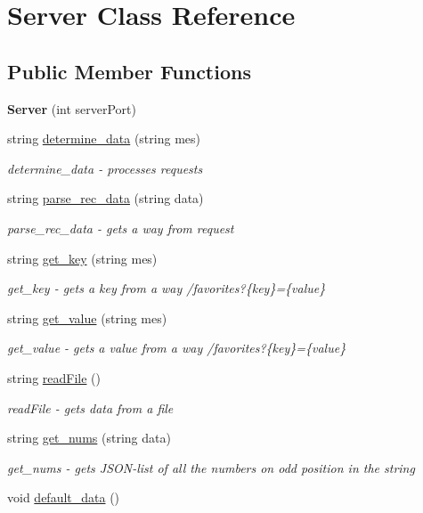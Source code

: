 \hypertarget{classServer}{}\section{Server Class Reference}
\label{classServer}
\subsection*{Public Member Functions}
\begin{DoxyCompactItemize}
\item 
{\bfseries Server} (int server\+Port)\hypertarget{classServer_aeae9f39088cd37184f26c07ba9948b96}{}\label{classServer_aeae9f39088cd37184f26c07ba9948b96}

\item 
string \hyperlink{classServer_ad77bc24f55d6ffb9628cc88d307fc8e2}{determine\+\_\+data} (string mes)
\begin{DoxyCompactList}\small\item\em determine\+\_\+data -\/ processes requests \end{DoxyCompactList}\item 
string \hyperlink{classServer_a6601c02b17df0bd6836290f036645b36}{parse\+\_\+rec\+\_\+data} (string data)
\begin{DoxyCompactList}\small\item\em parse\+\_\+rec\+\_\+data -\/ gets a way from request \end{DoxyCompactList}\item 
string \hyperlink{classServer_aa1732b25e1ebb60cb11d06d566159721}{get\+\_\+key} (string mes)
\begin{DoxyCompactList}\small\item\em get\+\_\+key -\/ gets a key from a way /favorites?\{key\}=\{value\} \end{DoxyCompactList}\item 
string \hyperlink{classServer_a4877a9b3fa397c9cf0ace2b7d3143ec3}{get\+\_\+value} (string mes)
\begin{DoxyCompactList}\small\item\em get\+\_\+value -\/ gets a value from a way /favorites?\{key\}=\{value\} \end{DoxyCompactList}\item 
string \hyperlink{classServer_ae2d1810ef81f64f97c6a2a54b155a474}{read\+File} ()
\begin{DoxyCompactList}\small\item\em read\+File -\/ gets data from a file \end{DoxyCompactList}\item 
string \hyperlink{classServer_a405eefbd18a6850ce2b417481c1571f6}{get\+\_\+nums} (string data)
\begin{DoxyCompactList}\small\item\em get\+\_\+nums -\/ gets J\+S\+O\+N-\/list of all the numbers on odd position in the string \end{DoxyCompactList}\item 
void \hyperlink{classServer_ad24f20494a5db747e0bcd015b1c8a72a}{default\+\_\+data} ()\hypertarget{classServer_ad24f20494a5db747e0bcd015b1c8a72a}{}\label{classServer_ad24f20494a5db747e0bcd015b1c8a72a}


\end{DoxyCompactItemize}
